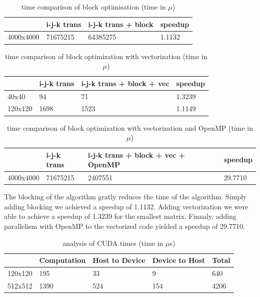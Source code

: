 \documentclass[a4paper]{report}
\begin{document}
\begin{table}[H]
\centering
\begin{tabular}{|l|l|l|l|}
\hline
          & i-j-k trans & i-j-k trans + block & speedup \\ \hline
4000x4000 & 71675215    & 64385275            & 1.1132  \\ \hline
\end{tabular}
\caption{time comparison of block optimisation (time in $\mu$)}
\end{table}

\begin{table}[H]
\centering
\begin{tabular}{|l|l|l|l|}
\hline
        & i-j-k trans & i-j-k trans + block + vec & speedup \\ \hline
40x40   & 94          & 71                        & 1.3239  \\ \hline
120x120 & 1698        & 1523                      & 1.1149  \\ \hline
\end{tabular}
\caption{time comparison of block optimization with vectorization (time in
$\mu$)}
\end{table}

\begin{table}[H]
\centering
\begin{tabular}{|l|l|l|l|}
\hline
          & i-j-k trans & i-j-k trans + block + vec + OpenMP & speedup \\ \hline
4000x4000 & 71675215    & 2407551                            & 29.7710 \\ \hline
\end{tabular}
\caption{time comparison of block optimization with vectorization and OpenMP (time in
$\mu$)}
\end{table}

The blocking of the algorithm gratly reduces the time of the algorithm. Simply
adding blocking we achieved a speedup of 1.1132. Adding vectorization we were
able to achieve a speedup of 1.3239 for the smallest matrix. Finnaly, adding
parallelism with OpenMP to the vectorized code yielded a speedup of 29.7710.

\begin{table}[H]
\centering
\begin{tabular}{|l|l|l|l|l|}
\hline
        & Computation & Host to Device & Device to Host & Total \\ \hline
120x120 & 195         & 33             & 9              & 640   \\ \hline
512x512 & 1390        & 524            & 154            & 4206  \\ \hline
\end{tabular}
\caption{analysis of CUDA times (time in $\mu$s)}
\end{table}
\end{document}
